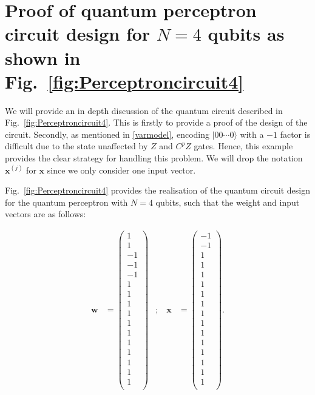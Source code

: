 \documentclass[twocolumn,superscriptaddress]{revtex4-1}
\begin{document}
\appendix{\label{app:app}}

\section{Proof of quantum perceptron circuit design for $N=4$ qubits as shown in Fig.~\ref{fig:Perceptroncircuit4}}\label{app:proof}

We will provide an in depth discussion of the quantum circuit described in Fig.~\ref{fig:Perceptroncircuit4}. This is firstly to provide a proof of the design of the circuit. Secondly, as mentioned in \ref{varmodel}, encoding $|00 \cdots 0\rangle$ with a $-1$ factor is difficult due to the state unaffected by $Z$ and $C^pZ$ gates. Hence, this example provides the clear strategy for handling this problem. We will drop the notation $\bm{x}^{(j)}$ for $\bm{x}$ since we only consider one input vector.

Fig.~\ref{fig:Perceptroncircuit4} provides the realisation of the quantum circuit design for the quantum perceptron with $N=4$ qubits, such that the weight and input vectors are as follows:


\begin{equation} \label{eq:weightinput4}
\begin{aligned}
\bm{w} &= 
\begin{pmatrix}
1 \\
1 \\
-1 \\
-1 \\
-1 \\
1 \\
1 \\
1 \\
1 \\
1 \\
1 \\
1 \\
1 \\
1 \\
1 \\
1 \\
\end{pmatrix}
& ; \hspace{10pt}
\bm{x} &= 
\begin{pmatrix}
-1 \\
-1 \\
1 \\
1 \\
1 \\
1 \\
1 \\
1 \\
1 \\
1 \\
1 \\
1 \\
1 \\
1 \\
1 \\
1 \\
\end{pmatrix}.
\end{aligned}
\end{equation}
\end{document}

